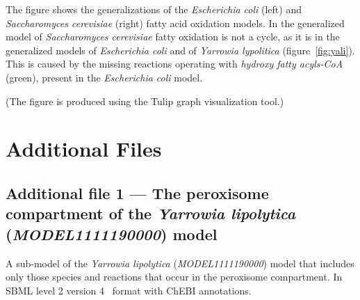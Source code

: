 \documentclass[9pt]{article}
\newcounter{fig}
\newcounter{rm}
\begin{document}
      The figure shows the generalizations of the \textit{Escherichia coli} (left) and \textit{Saccharomyces cerevisiae} (right) fatty acid oxidation models. In the generalized model of \textit{Saccharomyces cerevisiae} fatty oxidation is not a cycle, as it is in the generalized models of \textit{Escherichia coli} and of \textit{Yarrowia lypolitica} (figure~\ref{fig:yali}).  This is caused by the missing reactions operating with \textit{hydroxy fatty acyls-CoA} (green), present in the \textit{Escherichia coli} model.
      
      (The figure is produced using the Tulip graph visualization tool.)
\label{fig:gen}

\section*{Additional Files}
  \subsection*{Additional file 1 --- The peroxisome compartment of the \textit{Yarrowia lipolytica} (\emph{MODEL1111190000}) model}
    A sub-model of the \textit{Yarrowia lipolytica} (\emph{MODEL1111190000}) model that includes only those species and reactions that occur in the peroxisome compartment. In  SBML level 2 version 4~\citep{Hucka08} format with ChEBI annotations.
\end{document}
